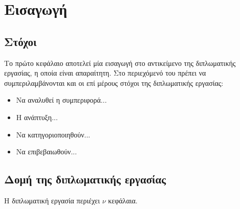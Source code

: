 \chapter{Εισαγωγή}
\label{ch:Introduction}


\section{Στόχοι}
\label{sec:Objectives}
Το πρώτο κεφάλαιο αποτελεί μία εισαγωγή στο αντικείμενο της διπλωματικής εργασίας, η οποία είναι απαραίτητη.
Στο περιεχόμενό του πρέπει να συμπεριλαμβάνονται και οι επί μέρους στόχοι της διπλωματικής εργασίας:
\begin{itemize}
	\item Να αναλυθεί η συμπεριφορά...
	\item Η ανάπτυξη...
	\item Να κατηγοριοποιηθούν...
	\item Να επιβεβαιωθούν...
\end{itemize}


\section{Δομή της διπλωματικής εργασίας}
\label{sec:Structure}
Η διπλωματική εργασία περιέχει $\nu$ κεφάλαια.